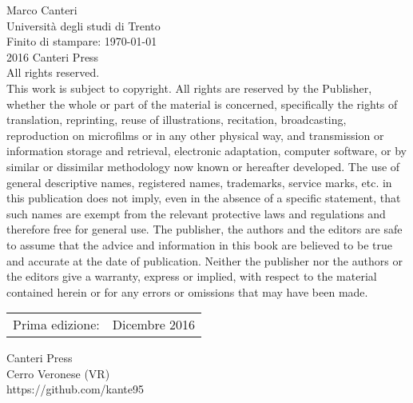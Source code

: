 \pagestyle{empty}
\begingroup
\footnotesize
\parindent 0pt
Marco Canteri\\
Università degli studi di Trento\\
Finito di stampare: \today
\vspace{\fill}\\

\textcopyright{} 2016 Canteri Press \\
All rights reserved.\\
This work is subject to copyright. All rights are reserved by the Publisher, whether the whole or part
of the material is concerned, specifically the rights of translation, reprinting, reuse of illustrations,
recitation, broadcasting, reproduction on microfilms or in any other physical way, and transmission
or information storage and retrieval, electronic adaptation, computer software, or by similar or dissimilar
methodology now known or hereafter developed.
The use of general descriptive names, registered names, trademarks, service marks, etc. in this
publication does not imply, even in the absence of a specific statement, that such names are exempt from
the relevant protective laws and regulations and therefore free for general use.
The publisher, the authors and the editors are safe to assume that the advice and information in this
book are believed to be true and accurate at the date of publication. Neither the publisher nor the
authors or the editors give a warranty, express or implied, with respect to the material contained herein or
for any errors or omissions that may have been made.


\vfill
\begin{center}
\begin{tabular}{ll}
Prima edizione:  & Dicembre 2016 \\
\end{tabular}
\end{center}


Canteri Press \\
Cerro Veronese (VR) \\
https://github.com/kante95



\endgroup
\clearpage 

